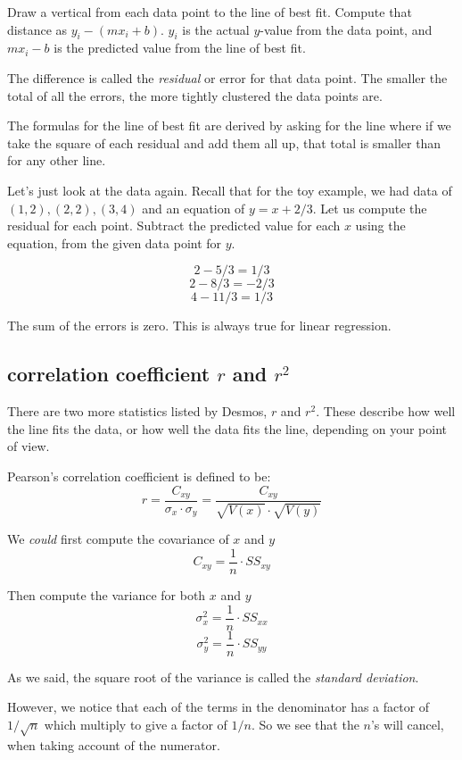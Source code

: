 \documentclass[11pt, oneside]{article}
\begin{document}
Draw a vertical from each data point to the line of best fit.  Compute that distance as $y_i - (mx_i + b)$.  $y_i$ is the actual $y$-value from the data point, and $mx_i - b$ is the predicted value from the line of best fit.

The difference is called the \emph{residual} or error for that data point.  The smaller the total of all the errors, the more tightly clustered the data points are.

The formulas for the line of best fit are derived by asking for the line where if we take the square of each residual and add them all up, that total is smaller than for any other line.

Let's just look at the data again.  Recall that for the toy example, we had data of $(1,2),(2,2),(3,4)$ and an equation of $y = x + 2/3$.  Let us compute the residual for each point.  Subtract the predicted value for each $x$ using the equation, from the given data point for $y$.

\[ 2 - 5/3 = 1/3 \]
\[ 2 - 8/3 = -2/3 \]
\[ 4 - 11/3 = 1/3 \]

The sum of the errors is zero.  This is always true for linear regression.

\subsection*{correlation coefficient $r$ and $r^2$}

There are two more statistics listed by Desmos, $r$ and $r^2$.  These describe how well the line fits the data, or how well the data fits the line, depending on your point of view.

Pearson's correlation coefficient is defined to be:
\[ r = \frac{C_{xy}}{\sigma_x \cdot \sigma_y} = \frac{C_{xy}}{\sqrt{V(x)} \cdot \sqrt{V(y)}} \]

We \emph{could} first compute the covariance of $x$ and $y$
\[ C_{xy} = \frac{1}{n} \cdot SS_{xy} \]

Then compute the variance for both $x$ and $y$
\[ \sigma^2_x = \frac{1}{n} \cdot SS_{xx} \]
\[ \sigma^2_y = \frac{1}{n} \cdot SS_{yy} \]

As we said, the square root of the variance is called the \emph{standard deviation}.

However, we notice that each of the terms in the denominator has a factor of $1/\sqrt{n}$ which multiply to give a factor of $1/n$.  So we see that the $n$'s will cancel, when taking account of the numerator.
\end{document}
